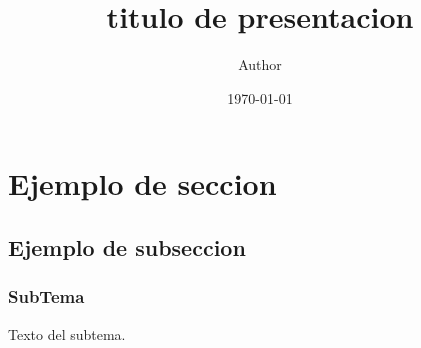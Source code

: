 \documentclass{beamer}
\title{titulo de presentacion}
\author{Author}
\date{\today}
\begin{document}
\frame[allowframebreaks]{\titlepage}

\section[Contenidos]{}
\frame{\tableofcontents}


\section{Ejemplo de seccion}
\subsection{Ejemplo de subseccion}


\frame
{
\frametitle{SubTema}
Texto del subtema.
}
\end{document}
